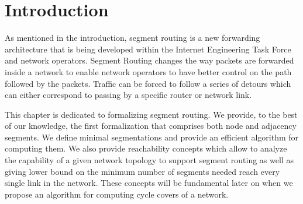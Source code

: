 \section*{Introduction}

As mentioned in the introduction, segment routing \cite{Filsfils_SR:2015} is a new forwarding architecture that is being developed within the Internet Engineering Task Force and network operators.
Segment Routing changes the way packets are forwarded
inside a network to enable network operators to have better
control on the path followed by the packets. Traffic can be forced to follow a series of detours
which can either correspond to passing by a specific router or network link.

This chapter is dedicated to formalizing segment routing. We provide, to the best of our knowledge, the first formalization that comprises
both node and adjacency segments. We define minimal segmentations and provide an efficient algorithm for computing 
them. We also provide reachability concepts which allow to analyze the capability of a given network topology
to support segment routing as well as giving lower bound on the minimum number of segments needed reach every single link
in the network. These concepts will be fundamental later on when we propose an algorithm for computing cycle covers 
of a network.

